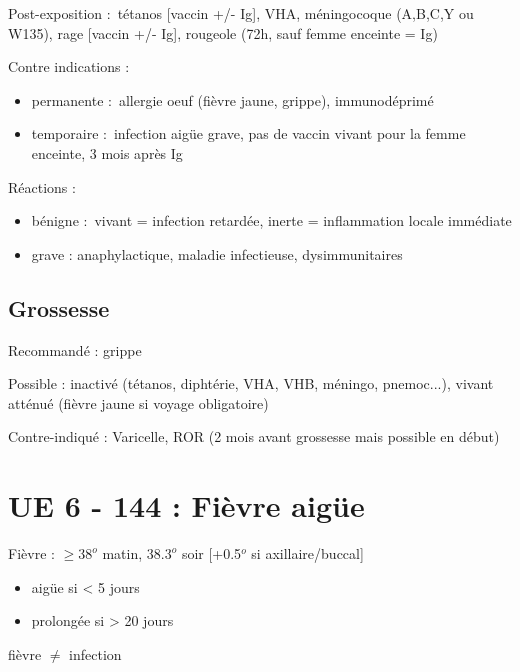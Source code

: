 Post-exposition : tétanos [vaccin +/- Ig], VHA, méningocoque (A,B,C,Y ou W135), rage [vaccin +/-
Ig], rougeole (72h, sauf femme enceinte = Ig)

Contre indications :
\begin{itemize}
  \item permanente : allergie oeuf (fièvre jaune, grippe), immunodéprimé
    \item temporaire : infection aigüe grave, pas de vaccin vivant pour la femme
      enceinte, 3 mois après Ig
\end{itemize}

Réactions :
\begin{itemize}
  \item bénigne : vivant = infection retardée, inerte = inflammation locale
    immédiate
    \item grave : anaphylactique, maladie infectieuse, dysimmunitaires
\end{itemize}

\subsection{Grossesse}%
\label{sub:grossesse}

Recommandé : grippe

Possible : inactivé (tétanos, diphtérie, VHA, VHB, méningo, pnemoc...), vivant
atténué (fièvre jaune si voyage obligatoire)

Contre-indiqué : Varicelle, ROR (2 mois avant grossesse mais possible en début)
\section{UE 6 - 144 : Fièvre aigüe}

Fièvre : \(\ge 38^{o}\) matin, \(38.3^{o}\) soir [+0.5$^{o}$ si axillaire/buccal]
\begin{itemize}
\item aigüe si \textless{} 5 jours
\item prolongée si \textgreater{} 20 jours
\end{itemize}

\danger fièvre \(\neq\) infection

